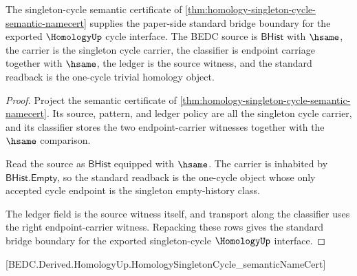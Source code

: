 \begin{theorem}
\label{thm:homology-singleton-cycle-standard-bridge-boundary}
The singleton-cycle semantic certificate of \autoref{thm:homology-singleton-cycle-semantic-namecert} supplies the paper-side standard bridge boundary for the exported $\HomologyUp$ cycle interface. The BEDC source is $\mathsf{BHist}$ with $\hsame$, the carrier is the singleton cycle carrier, the classifier is endpoint carriage together with $\hsame$, the ledger is the source witness, and the standard readback is the one-cycle trivial homology object.
\end{theorem}
\begin{proof}
Project the semantic certificate of \autoref{thm:homology-singleton-cycle-semantic-namecert}. Its source, pattern, and ledger policy are all the singleton cycle carrier, and its classifier stores the two endpoint-carrier witnesses together with the $\hsame$ comparison.

Read the source as $\mathsf{BHist}$ equipped with $\hsame$. The carrier is inhabited by $\mathsf{BHist.Empty}$, so the standard readback is the one-cycle object whose only accepted cycle endpoint is the singleton empty-history class.

The ledger field is the source witness itself, and transport along the classifier uses the right endpoint-carrier witness. Repacking these rows gives the standard bridge boundary for the exported singleton-cycle $\HomologyUp$ interface.
\end{proof}

[BEDC.Derived.HomologyUp.HomologySingletonCycle\_semanticNameCert]

